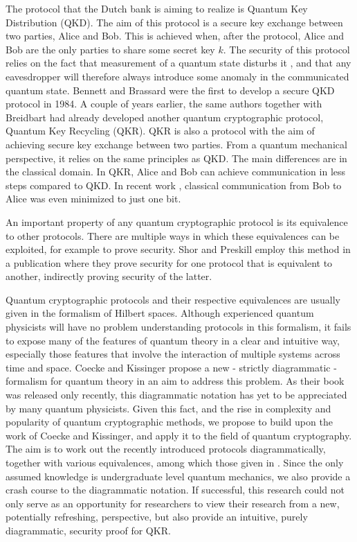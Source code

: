 \documentclass[]{article}
\begin{document}
The protocol that the Dutch bank is aiming to realize is Quantum Key Distribution (QKD). The aim of this protocol is a secure key exchange between two parties, Alice and Bob. This is achieved when, after the protocol, Alice and Bob are the only parties to share some secret key $k$. The security of this protocol relies on the fact that measurement of a quantum state disturbs it \cite{Lindblad1999}, and that any eavesdropper will therefore always introduce some anomaly in the communicated quantum state. Bennett and Brassard were the first to develop a secure QKD protocol in 1984. A couple of years earlier, the same authors together with Breidbart had already developed another quantum cryptographic protocol, Quantum Key Recycling (QKR). QKR is also a protocol with the aim of achieving secure key exchange between two parties. From a quantum mechanical perspective, it relies on the same principles as QKD. The main differences are in the classical domain. In QKR, Alice and Bob can achieve communication in less steps compared to QKD. In recent work \cite{Leermakers2019}, classical communication from Bob to Alice was even minimized to just one bit. 

An important property of any quantum cryptographic protocol is its equivalence to other protocols. There are multiple ways in which these equivalences can be exploited, for example to prove security. Shor and Preskill employ this method in a publication \cite{Shor2000} where they prove security for one protocol that is equivalent to another, indirectly proving security of the latter.

Quantum cryptographic protocols and their respective equivalences are usually given in the formalism of Hilbert spaces. Although experienced quantum physicists will have no problem understanding protocols in this formalism, it fails to expose many of the features of quantum theory in a clear and intuitive way, especially those features that involve the interaction of multiple systems across time and space. Coecke and Kissinger \cite{Coecke2017} propose a new - strictly diagrammatic - formalism for quantum theory in an aim to address this problem. As their book was released only recently, this diagrammatic notation has yet to be appreciated by many quantum physicists. Given this fact, and the rise in complexity and popularity of quantum cryptographic methods, we propose to build upon the work of Coecke and Kissinger, and apply it to the field of quantum cryptography. The aim is to work out the recently introduced protocols diagrammatically, together with various equivalences, among which those given in \cite{cryptoeprint:2019:875}. Since the only assumed knowledge is undergraduate level quantum mechanics, we also provide a crash course to the diagrammatic notation. If successful, this research could not only serve as an opportunity for researchers to view their research from a new, potentially refreshing, perspective, but also provide an intuitive, purely diagrammatic, security proof for QKR.
\end{document}

